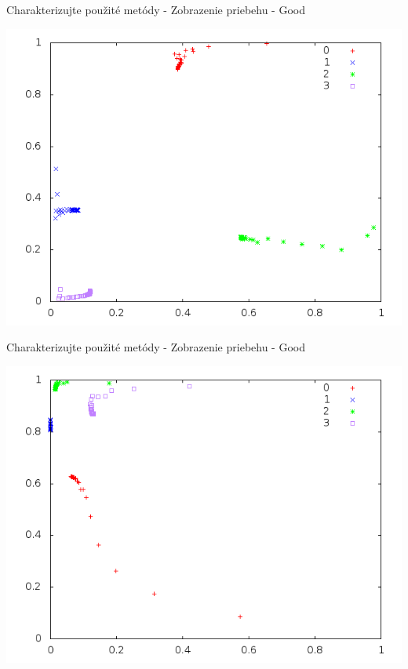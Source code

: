 \documentclass[xcolor=dvipsnames]{beamer}
\begin{document}
\begin{frame}{Charakterizujte použité metódy - Zobrazenie priebehu - Good}
    \begin{center}
      \includegraphics[scale=0.5]{img/nice.png}
    \end{center} 
\end{frame} 
\begin{frame}{Charakterizujte použité metódy - Zobrazenie priebehu - Good}
    \begin{center}
      \includegraphics[scale=0.5]{img/left_top.png}
    \end{center} 
\end{frame}
\end{document}
